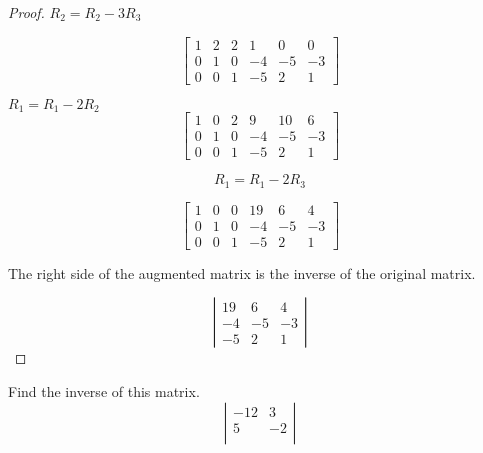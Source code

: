 \documentclass[8pt]{article}
\newenvironment{problem}[2][Problem]{\begin{trivlist}
\item[\hskip \labelsep {\bfseries #1}\hskip \labelsep {\bfseries #2.}]}{\end{trivlist}}
\begin{document}
\begin{proof}
$R_2 = R_2 - 3R_3$

\[\left[\begin{array}{ccc|ccc}  
1 & 2 & 2 & 1 & 0 & 0 \\  
0 & 1 & 0 & -4 & -5 & -3  \\
0 & 0 & 1 & -5 & 2 & 1  
\end{array} \right]\]

$R_1 = R_1 - 2R_2$
\[\left[\begin{array}{ccc|ccc}  
1 & 0 & 2 & 9 & 10 & 6 \\  
0 & 1 & 0 & -4 & -5 & -3  \\
0 & 0 & 1 & -5 & 2 & 1  
\end{array} \right]\]

\[R_1 = R_1 - 2R_3\]

\[\left[\begin{array}{ccc|ccc}  
1 & 0 & 0 & 19 & 6 & 4 \\  
0 & 1 & 0 & -4 & -5 & -3  \\
0 & 0 & 1 & -5 & 2 & 1  
\end{array} \right]\]


The right side of the augmented matrix is the inverse of the original matrix. 

\[ \boxed{ \left| 
\begin{array}{ccc}
19 & 6 & 4 \\
-4 & -5 & -3 \\
-5 & 2 & 1 \end{array}\right| }
\] 


\end{proof}


\begin{problem}{34}
	Find the inverse of this matrix. 
\[  \left| 
\begin{array}{ccc}
-12 & 3 \\
5 & -2  \\
\end{array} 
\right|\] 
\end{problem}
\end{document}
